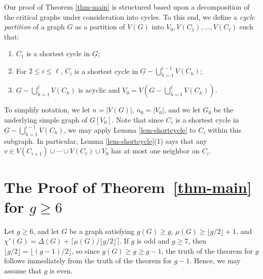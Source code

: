 \documentclass[12pt,oneside]{amsart}
\begin{document}
Our proof of Theorem \ref{thm-main} is structured based upon a decomposition of the critical graphs under consideration into cycles. To this end, we define a {\it cycle partition} of a graph $G$ as a partition of $V(G)$ into  $V_0, V(C_1), \ldots, V(C_\ell)$ such that:
\begin{enumerate}
\item $C_1$ is a shortest cycle in $\underline{G}$;
\item For $2\leq i \leq \ell$, $C_{i}$ is a shortest cycle in  $\underline{G} - \bigcup_{h=1}^{i-1} V(C_h)$;
\item $\underline{G} -\bigcup_{h=1}^{\ell}V(C_h)$ is acyclic and  $V_0=V(G -\bigcup_{h=1}^{\ell}V(C_h))$.
\end{enumerate}
To simplify notation, we let $n=|V(G)|$, $n_0=|V_0|$, and we let $G_0$ be the underlying simple graph of $G[V_0]$. Note that since $C_{i}$ is a shortest cycle in  $\underline{G} - \bigcup_{h=1}^{i-1} V(C_h)$,  we may apply Lemma \ref{lem-shortcycle} to $C_i$ within this subgraph. In particular, Lemma \ref{lem-shortcycle}(1) says that any $v\in V(C_{i+1})\cup \cdots \cup V(C_{\ell})\cup V_0$ has at most one neighbor on $C_i$.




\section{The Proof of  Theorem~\ref{thm-main} for \texorpdfstring{$g\geq 6$}{ggeq6}}\label{mainpf}



Let \(g \ge 6\), and let \(G\) be a graph satisfying
\(g(G) \ge g\), \(\mu(G) \ge \lfloor g/2 \rfloor + 1\), and
\(\chi'(G) = \Delta(G) + \lceil \mu(G)/\lfloor g/2 \rfloor \rceil\).
If \(g\) is odd and $g \ge 7$, then $\lfloor g/2\rfloor=\lfloor (g-1)/2\rfloor$, so since \(g(G) \ge g \ge g-1\), the truth of the theorem for \(g\) follows immediately from the truth of the theorem for \(g-1\).
Hence, we may assume that \(g\) is even.
\end{document}
